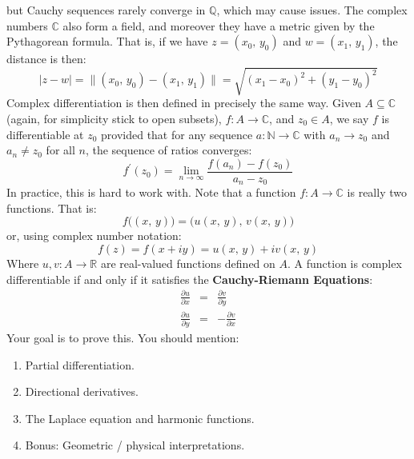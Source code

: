 \documentclass{article}
\begin{document}
    but Cauchy sequences rarely converge in $\mathbb{Q}$, which may cause
    issues. The complex numbers $\mathbb{C}$ also form a field, and moreover
    they have a metric given by the Pythagorean formula. That is, if we have
    $z=(x_{0},\,y_{0})$ and $w=(x_{1},\,y_{1})$, the distance is then:
    \begin{equation}
        |z-w|
        =\|(x_{0},\,y_{0})-(x_{1},\,y_{1})\|
        =\sqrt{(x_{1}-x_{0})^{2}+(y_{1}-y_{0})^{2}}
    \end{equation}
    Complex differentiation is then defined in precisely the same way.
    Given $A\subseteq\mathbb{C}$ (again, for simplicity stick to open subsets),
    $f:A\rightarrow\mathbb{C}$, and
    $z_{0}\in{A}$, we say $f$ is differentiable at $z_{0}$ provided that for
    any sequence $a:\mathbb{N}\rightarrow\mathbb{C}$ with
    $a_{n}\rightarrow{z}_{0}$ and $a_{n}\ne{z}_{0}$ for all $n$, the sequence
    of ratios converges:
    \begin{equation}
        f^{\prime}(z_{0})
        =\lim_{n\rightarrow\infty}
        \frac{f(a_{n})-f(z_{0})}{a_{n}-z_{0}}
    \end{equation}
    In practice, this is hard to work with. Note that a function
    $f:A\rightarrow\mathbb{C}$ is really two functions. That is:
    \begin{equation}
        f\big((x,\,y)\big)
        =\big(u(x,\,y),\,v(x,\,y))
    \end{equation}
    or, using complex number notation:
    \begin{equation}
        f(z)=f(x+iy)=u(x,\,y)+iv(x,\,y)
    \end{equation}
    Where $u,v:A\rightarrow\mathbb{R}$ are real-valued functions defined on
    $A$. A function is complex differentiable if and only if it satisfies the
    \textbf{Cauchy-Riemann Equations}:
    \begin{equation}
        \begin{array}{rcl}
            \displaystyle
            \frac{\partial{u}}{\partial{x}}
            &=&
            \displaystyle
            \frac{\partial{v}}{\partial{y}}\\
            [1.5em]
            \displaystyle
            \frac{\partial{u}}{\partial{y}}
            &=&
            \displaystyle
            -\frac{\partial{v}}{\partial{x}}
        \end{array}
    \end{equation}
    Your goal is to prove this. You should mention:
    \begin{enumerate}
        \item
            Partial differentiation.
        \item
            Directional derivatives.
        \item
            The Laplace equation and harmonic functions.
        \item
            Bonus: Geometric / physical interpretations.
    \end{enumerate}
\end{document}

